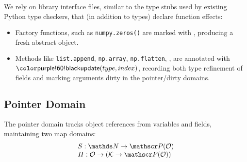 We rely on library interface files, similar to the type stubs used by existing Python type checkers, that (in addition to types) declare function effects:

\begin{itemize}
  \item Factory functions, such as \texttt{numpy.zeros()} are marked with \tnew, producing a fresh abstract object.
  \item Methods like \lstinline|list.append|, \lstinline|np.array|, \lstinline|np.flatten|, \etc, are annotated with $\tupdate(type, index)$, recording both type refinement of fields and marking arguments dirty in the pointer/dirty domains.
\end{itemize}

\subsection{Pointer Domain}
\label{sec:pointer}

The pointer domain tracks object references from variables
and fields, maintaining two map domains:
%
\[
\begin{array}{@{}l@{}}
  S : \tN \to \powerset(\tO) \\
  H : \tO \to (\tK \to \powerset(\tO))
\end{array}
\]


